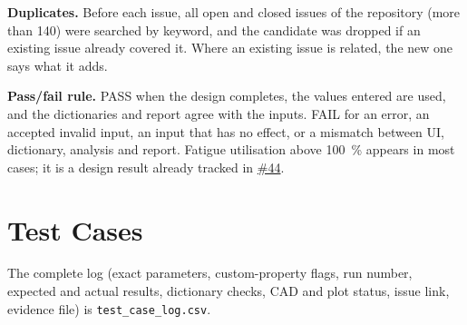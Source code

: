 \documentclass[10pt,a4paper]{article}
\newcommand{\gh}[1]{\href{https://github.com/Nidhikhare12/OsdagBridge/issues/#1}{\##1}}
\begin{document}
\textbf{Duplicates.} Before each issue, all open and closed issues of the repository (more than 140) were searched by keyword, and the candidate was dropped if an existing issue already covered it. Where an existing issue is related, the new one says what it adds.

\textbf{Pass/fail rule.} PASS when the design completes, the values entered are used, and the dictionaries and report agree with the inputs. FAIL for an error, an accepted invalid input, an input that has no effect, or a mismatch between UI, dictionary, analysis and report. Fatigue utilisation above 100~\% appears in most cases; it is a design result already tracked in \gh{44}.

\section{Test Cases}
The complete log (exact parameters, custom-property flags, run number, expected and actual results, dictionary checks, CAD and plot status, issue link, evidence file) is \texttt{test\_case\_log.csv}.
\end{document}
